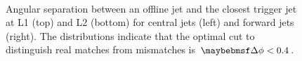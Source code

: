 \begin{figure}[htpb]
{    \label{fig:dijets:dPhi_L1fj24_29}}
  \\
  \quad
  \caption{Angular separation \DeltaPhi between an offline jet and the closest trigger
           jet at L1 (top) and L2 (bottom) for central jets (left) and forward jets
           (right). The distributions indicate that the optimal
           \DeltaPhi cut to distinguish real matches from mismatches is $\DeltaPhi < 0.4$.}
  \label{fig:dijets:DeltaPhi}
\end{figure}



